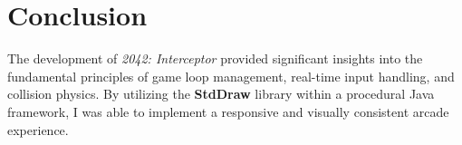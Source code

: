\documentclass[11pt,a4paper]{article}
\begin{document}
\section{Conclusion}
The development of \textit{2042: Interceptor} provided significant insights into the fundamental principles of game loop management, real-time input handling, and collision physics. By utilizing the \textbf{StdDraw} library within a procedural Java framework, I was able to implement a responsive and visually consistent arcade experience.
\end{document}
